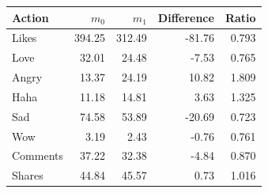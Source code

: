 \begin{tabular}{lrrrr}
\toprule
Action & $m_0$ & $m_1$ & Difference & Ratio \\
\midrule
Likes & 394.25 & 312.49 & -81.76 & 0.793 \\
Love & 32.01 & 24.48 & -7.53 & 0.765 \\
Angry & 13.37 & 24.19 & 10.82 & 1.809 \\
Haha & 11.18 & 14.81 & 3.63 & 1.325 \\
Sad & 74.58 & 53.89 & -20.69 & 0.723 \\
Wow & 3.19 & 2.43 & -0.76 & 0.761 \\
Comments & 37.22 & 32.38 & -4.84 & 0.870 \\
Shares & 44.84 & 45.57 & 0.73 & 1.016 \\
\bottomrule
\end{tabular}
